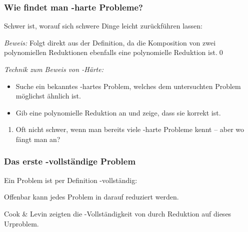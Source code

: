 \documentclass[onlymath]{beamer}
\begin{document}
\begin{frame}\frametitle{Wie findet man -harte Probleme?}

Schwer ist, worauf sich schwere Dinge leicht zurückführen lassen:


\emph{Beweis:} Folgt direkt aus der Definition, da die Komposition von zwei polynomiellen Reduktionen ebenfalls eine
polynomielle Reduktion ist.\qed
\bigskip\pause

\emph{Technik zum Beweis von -Härte:}
\begin{itemize}
\item Suche ein bekanntes -hartes Problem, welches dem untersuchten Problem möglichst ähnlich ist.
\item Gib eine polynomielle Reduktion an und zeige, dass sie korrekt ist.
\end{itemize}
\begin{enumerate}[$\leadsto$]
\item Oft nicht schwer, wenn man bereits viele -harte Probleme kennt -- aber wo fängt man an?
\end{enumerate}

\end{frame}

\begin{frame}\frametitle{Das erste -vollständige Problem}

Ein Problem ist per Definition -vollständig:\\[1ex]


Offenbar kann jedes Problem in  darauf reduziert werden.
\bigskip

Cook \& Levin zeigten die -Vollständigkeit von  durch Reduktion auf dieses
Urproblem.

\end{frame}
\end{document}
